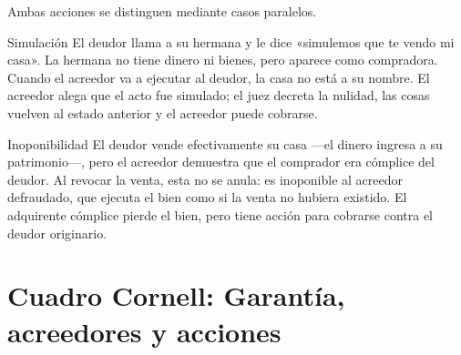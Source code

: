\documentclass[12pt,oneside]{book}
\begin{document}
Ambas acciones se distinguen mediante casos paralelos.

\begin{example}{Simulación}
El deudor llama a su hermana y le dice «simulemos que te vendo mi casa». La hermana no tiene dinero ni bienes, pero aparece como compradora. Cuando el acreedor va a ejecutar al deudor, la casa no está a su nombre. El acreedor alega que el acto fue simulado; el juez decreta la nulidad, las cosas vuelven al estado anterior y el acreedor puede cobrarse.
\end{example}

\begin{example}{Inoponibilidad}
El deudor vende efectivamente su casa ---el dinero ingresa a su patrimonio---, pero el acreedor demuestra que el comprador era cómplice del deudor. Al revocar la venta, esta no se anula: es inoponible al acreedor defraudado, que ejecuta el bien como si la venta no hubiera existido. El adquirente cómplice pierde el bien, pero tiene acción para cobrarse contra el deudor originario.
\end{example}

\section{Cuadro Cornell: Garantía, acreedores y acciones}
\end{document}
